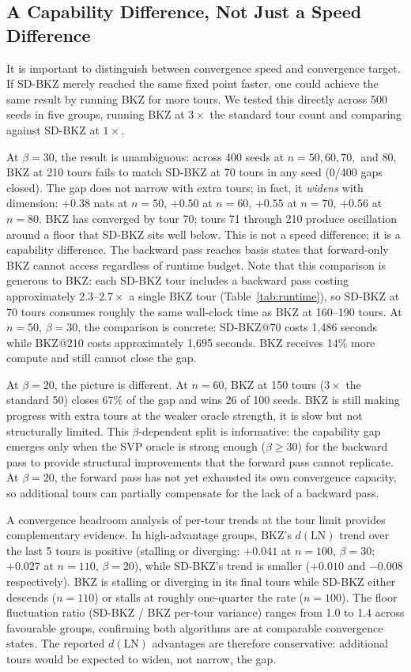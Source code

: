 \documentclass[journal=cic,version=preprint]{iacrj}
\begin{document}
\subsection{A Capability Difference, Not Just a Speed Difference}
\label{sec:capability}

It is important to distinguish between convergence speed and convergence target. If SD-BKZ merely reached the same fixed point faster, one could achieve the same result by running BKZ for more tours. We tested this directly across 500 seeds in five groups, running BKZ at $3\times$ the standard tour count and comparing against SD-BKZ at $1\times$.

At $\beta=30$, the result is unambiguous: across 400 seeds at $n=50, 60, 70,$ and $80$, BKZ at 210 tours fails to match SD-BKZ at 70 tours in any seed (0/400 gaps closed). The gap does not narrow with extra tours; in fact, it \emph{widens} with dimension: $+0.38$ nats at $n=50$, $+0.50$ at $n=60$, $+0.55$ at $n=70$, $+0.56$ at $n=80$. BKZ has converged by tour 70; tours 71 through 210 produce oscillation around a floor that SD-BKZ sits well below. This is not a speed difference; it is a capability difference. The backward pass reaches basis states that forward-only BKZ cannot access regardless of runtime budget. Note that this comparison is generous to BKZ: each SD-BKZ tour includes a backward pass costing approximately $2.3$--$2.7\times$ a single BKZ tour (Table~\ref{tab:runtime}), so SD-BKZ at 70 tours consumes roughly the same wall-clock time as BKZ at 160--190 tours. At $n=50$, $\beta=30$, the comparison is concrete: SD-BKZ@70 costs 1{,}486 seconds while BKZ@210 costs approximately 1{,}695 seconds. BKZ receives 14\% more compute and still cannot close the gap.

At $\beta=20$, the picture is different. At $n=60$, BKZ at 150 tours ($3\times$ the standard 50) closes 67\% of the gap and wins 26 of 100 seeds. BKZ is still making progress with extra tours at the weaker oracle strength, it is slow but not structurally limited. This $\beta$-dependent split is informative: the capability gap emerges only when the SVP oracle is strong enough ($\beta\geq 30$) for the backward pass to provide structural improvements that the forward pass cannot replicate. At $\beta=20$, the forward pass has not yet exhausted its own convergence capacity, so additional tours can partially compensate for the lack of a backward pass.

A convergence headroom analysis of per-tour trends at the tour limit provides complementary evidence. In high-advantage groups, BKZ's $d(\mathrm{LN})$ trend over the last 5 tours is positive (stalling or diverging: $+0.041$ at $n=100$, $\beta=30$; $+0.027$ at $n=110$, $\beta=20$), while SD-BKZ's trend is smaller ($+0.010$ and $-0.008$ respectively). BKZ is stalling or diverging in its final tours while SD-BKZ either descends ($n=110$) or stalls at roughly one-quarter the rate ($n=100$). The floor fluctuation ratio (SD-BKZ / BKZ per-tour variance) ranges from 1.0 to 1.4 across favourable groups, confirming both algorithms are at comparable convergence states. The reported $d(\mathrm{LN})$ advantages are therefore conservative: additional tours would be expected to widen, not narrow, the gap.
\end{document}
